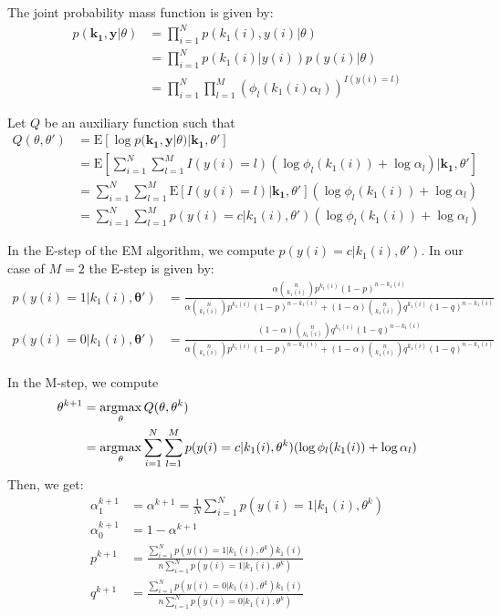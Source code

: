 The joint probability mass function is given by:
\begin{align*}
p(\mathbf{k_1}, \mathbf{y} | \theta ) &= \prod_{i=1}^{N} p(k_1(i), y(i) | \theta ) \\
&= \prod_{i=1}^{N} p(k_1(i) | y(i) ) p(y(i) | \theta )  \\
&= \prod_{i=1}^{N} \prod_{l=1}^{M} (\phi_l(k_1(i) \alpha_l)) ^ {I(y(i)=l)}
\end{align*}

Let $Q$ be an auxiliary function such that
\begin{align*}
Q(\theta, \theta') &= \mathrm{E} \left[ \log p(\mathbf{k_1}, \mathbf{y} | \theta ) | \mathbf{k_1}, \theta' \right] \\
&= \mathrm{E} \left[ \sum_{i=1}^{N} \sum_{l=1}^{M} I(y(i)=l) (\log \phi_l(k_1(i)) + \log \alpha_l) | \mathbf{k_1}, \theta' \right] \\
&= \sum_{i=1}^{N} \sum_{l=1}^{M} \mathrm{E} \left[ I(y(i)=l) | \mathbf{k_1}, \theta' \right] (\log \phi_l(k_1(i)) + \log \alpha_l)  \\
&= \sum_{i=1}^{N} \sum_{l=1}^{M} p(y(i) = c | k_1(i), \theta') (\log \phi_l(k_1(i)) + \log \alpha_l)
\end{align*}

In the E-step of the EM algorithm, we compute $p(y(i) = c | k_1(i), \theta')$. 
In our case of $M=2$ the E-step is given by:
\begin{align*}
p(y(i) = 1 | k_1(i), \mathbf{\theta'}) &= \frac{\alpha \binom{n}{k_1(i)} p^{k_1(i)} (1-p)^{n-k_1(i)}}{\alpha \binom{n}{k_1(i)} p^{k_1(i)} (1-p)^{n-k_1(i)} + (1-\alpha) \binom{n}{k_1(i)} q^{k_1(i)} (1-q)^{n-k_1(i)}} \\
p(y(i) = 0 | k_1(i), \mathbf{\theta'}) &= \frac{(1-\alpha) \binom{n}{k_1(i)} q^{k_1(i)} (1-q)^{n-k_1(i)}}{\alpha \binom{n}{k_1(i)} p^{k_1(i)} (1-p)^{n-k_1(i)} + (1-\alpha) \binom{n}{k_1(i)} q^{k_1(i)} (1-q)^{n-k_1(i)}}
\end{align*}

In the M-step, we compute
\begin{align*}
\theta^{k+1} &= \operatorname*{\arg\!\max}_\theta Q(\theta, \theta^{k}) \\
&= \operatorname*{\arg\!\max}_\theta \sum_{i=1}^{N} \sum_{l=1}^{M} p(y(i) = c | k_1(i), \theta^{k}) (\log \phi_l(k_1(i)) + \log \alpha_l)
\end{align*}
Then, we get:
\begin{align*}
\alpha_1^{k+1} &= \alpha^{k+1} = \frac{1}{N} \sum_{i=1}^{N} p(y(i) = 1 | k_1(i), \theta^{k}) \\
\alpha_0^{k+1} &= 1 - \alpha^{k+1} \\
p^{k+1} &= \frac{\sum_{i=1}^{N} p(y(i) = 1 | k_1(i), \theta^{k}) k_1(i)}{n \sum_{i=1}^{N} p(y(i) = 1 | k_1(i), \theta^{k})} \\
q^{k+1} &= \frac{\sum_{i=1}^{N} p(y(i) = 0 | k_1(i), \theta^{k}) k_1(i)}{n \sum_{i=1}^{N} p(y(i) = 0 | k_1(i), \theta^{k})}
\end{align*}

